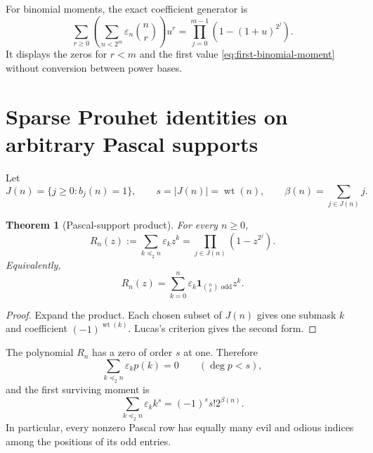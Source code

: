 \documentclass[11pt,oneside]{article}
\numberwithin{equation}{section}
\newtheorem{theorem}{Theorem}[section]
\theoremstyle{definition}
\theoremstyle{remark}
\newcommand{\wt}{\operatorname{wt}}
\newcommand{\eps}{\varepsilon}
\newcommand{\ind}{\mathbf 1}
\newcommand{\submask}{\preceq_2}
\begin{document}
For binomial moments, the exact coefficient generator is
\begin{equation}
 \boxed{\sum_{r\ge0}\left(\sum_{n<2^m}\eps_n\binom nr\right)u^r
 =\prod_{j=0}^{m-1}\left(1-(1+u)^{2^j}\right).}
 \label{eq:all-binomial-moments}
\end{equation}
It displays the zeros for \(r<m\) and the first value
\eqref{eq:first-binomial-moment} without conversion between power bases.

\section{Sparse Prouhet identities on arbitrary Pascal supports}
\label{sec:sparse}

Let
\begin{equation}
 J(n)=\{j\ge0:b_j(n)=1\},\qquad
 s=|J(n)|=\wt(n),\qquad
 \beta(n)=\sum_{j\in J(n)}j.
 \label{eq:J-beta}
\end{equation}

\begin{theorem}[Pascal-support product]
For every \(n\ge0\),
\begin{equation}
 \boxed{R_n(z):=\sum_{k\submask n}\eps_kz^k
 =\prod_{j\in J(n)}(1-z^{2^j}).}
 \label{eq:sparse-product}
\end{equation}
Equivalently,
\begin{equation}
 R_n(z)=\sum_{k=0}^n\eps_k
 \ind_{\binom nk\text{ odd}}z^k.
 \label{eq:sparse-Pascal}
\end{equation}
\end{theorem}

\begin{proof}
Expand the product.  Each chosen subset of \(J(n)\) gives one submask \(k\)
and coefficient \((-1)^{\wt(k)}\).  Lucas's criterion gives the second form.
\end{proof}

The polynomial \(R_n\) has a zero of order \(s\) at one.  Therefore
\begin{equation}
 \boxed{\sum_{k\submask n}\eps_kp(k)=0\qquad(\deg p<s),}
 \label{eq:sparse-prouhet}
\end{equation}
and the first surviving moment is
\begin{equation}
 \boxed{\sum_{k\submask n}\eps_kk^s
 =(-1)^ss!2^{\beta(n)}.}
 \label{eq:sparse-first-moment}
\end{equation}
In particular, every nonzero Pascal row has equally many evil and odious
indices among the positions of its odd entries.
\end{document}
